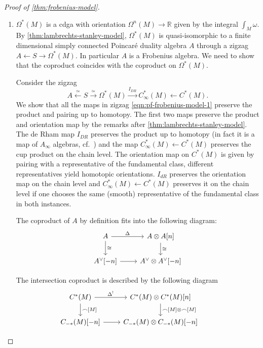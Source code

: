 \documentclass{scrartcl}
\theoremstyle{plain}
\theoremstyle{definition}
\newcommand{\R}{\mathbb R}
\newcommand{\capp}{\mathbin{\frown}}
\newcommand{\iso}{\cong}
\newcommand{\quiso}{\simeq}
\newcommand{\from}{\leftarrow}
\let\xto\xrightarrow
\let\xfrom\xleftarrow
\begin{document}
\begin{proof}[Proof of \cref{thm:frobenius-model}]
    \begin{enumerate}
        \item 
    $\Omega^*(M)$ is a cdga with orientation $\Omega^n(M)\to \R$ given by the integral $\int_M\omega$. By \cref{thm:lambrechts-stanley-model}, $\Omega^*(M)$ is quasi-isomorphic to a finite dimensional simply connected Poincaré duality algebra $A$ through a zigzag $A\from S\to \Omega^*(M)$. In particular $A$ is a Frobenius algebra. We need to show that the coproduct coincides with the coproduct on $\Omega^*(M)$. 


    Consider the zigzag $$A\xfrom{\quiso} S \xto{\quiso} \Omega^*(M)\xto{I_{DR}} C^*_\infty(M) \from C^*(M).\label{eqn:pf-frobenius-model-1}$$ We show that all the maps in zigzag \ref{eqn:pf-frobenius-model-1} preserve the product and pairing up to homotopy. The first two maps preserve the product and orientation map by the remarks after \cref{thm:lambrechts-stanley-model}. The de Rham map $I_{DR}$ preserves the product up to homotopy (in fact it is a map of $A_\infty$ algebras, cf.\ \cite{gugenheim1977chen}) and the map $C^*_\infty(M) \from C^*(M)$ preserves the cup product on the chain level. The orientation map on $C^*(M)$ is given by pairing with a representative of the fundamental class, different representatives yield homotopic orientations. $I_{dR}$ preserves the orientation map on the chain level and $C^*_\infty(M) \from C^*(M)$ preserves it on the chain level if one chooses the same (smooth) representative of the fundamental class in both instances. 

    The coproduct of $A$ by definition fits into the following diagram:
    \begin{equation}\label{diag:pf-frobenius-model-1}
        \begin{tikzcd}
            A \dar["\iso"]\rar["\Delta"] & A\otimes A[n] \dar["\iso"] \\
            A^\vee[-n] \rar & A^\vee\otimes A^\vee[-n]
        \end{tikzcd}
    \end{equation}

    The intersection coproduct is described by the following diagram
    \begin{equation}\label{diag:pf-frobenius-model-2}
    \begin{tikzcd}
    C^*(M) \dar["\capp {[M]}"] \rar["\Delta^!"] & C^{*}(M)\otimes C^*(M)[n] \dar["\capp{[M]}\otimes\capp{[M]}"] \\
    C_{-*}(M)[-n] \rar & C_{-*}(M)\otimes C_{-*}(M)[-n] &
    \end{tikzcd}
    \end{equation}


\end{enumerate}
\end{proof}
\end{document}
